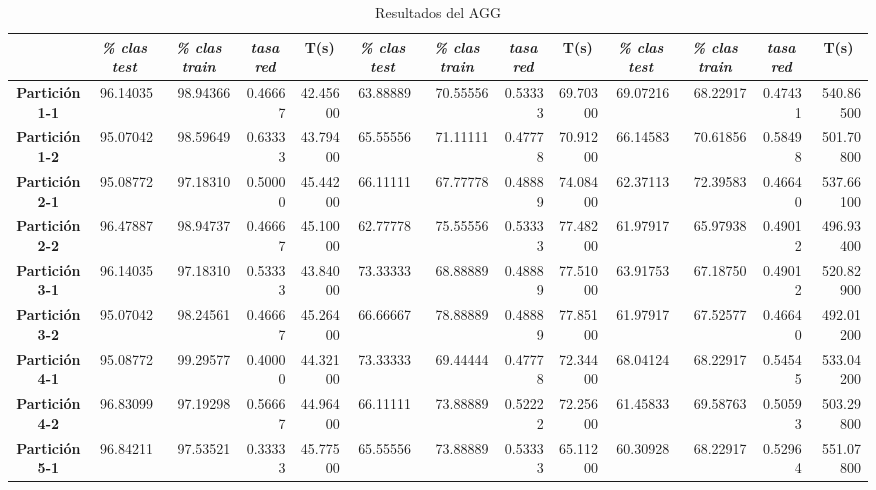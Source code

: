 \documentclass[a4paper,11pt]{article}
\begin{document}
 
 \begin{table}[H]	
  \caption{Resultados del AGG}
  \begin{adjustbox}{width=1.1\textwidth}
  \begin{tabular}{|c|r|r|r|r|r|r|r|r|r|r|r|r|}
  \hline
  \multicolumn{1}{|l|}{} & \multicolumn{1}{c|}{\textbf{\textit{\% clas test}}} & \multicolumn{1}{c|}{\textbf{\textit{\% clas train}}} & \multicolumn{1}{c|}{\textbf{\textit{tasa red}}} & \multicolumn{1}{c|}{\textbf{T(s)}} & \multicolumn{1}{c|}{\textbf{\textit{\% clas test}}} & \multicolumn{1}{c|}{\textbf{\textit{\% clas train}}} & \multicolumn{1}{c|}{\textbf{\textit{tasa red}}} & \multicolumn{1}{c|}{\textbf{T(s)}} & \multicolumn{1}{c|}{\textbf{\textit{\% clas test}}} & \multicolumn{1}{c|}{\textbf{\textit{\% clas train}}} & \multicolumn{1}{c|}{\textbf{\textit{tasa red}}} & \multicolumn{1}{c|}{\textbf{T(s)}} \\ \hline
  \textbf{Partición 1-1} & 96.14035 & 98.94366 & 0.46667 & 42.45600 & 63.88889 & 70.55556 & 0.53333 & 69.70300 & 69.07216 & 68.22917 & 0.47431 & 540.86500 \\ \hline
  \textbf{Partición 1-2} & 95.07042 & 98.59649 & 0.63333 & 43.79400 & 65.55556 & 71.11111 & 0.47778 & 70.91200 & 66.14583 & 70.61856 & 0.58498 & 501.70800 \\ \hline
  \textbf{Partición 2-1} & 95.08772 & 97.18310 & 0.50000 & 45.44200 & 66.11111 & 67.77778 & 0.48889 & 74.08400 & 62.37113 & 72.39583 & 0.46640 & 537.66100 \\ \hline
  \textbf{Partición 2-2} & 96.47887 & 98.94737 & 0.46667 & 45.10000 & 62.77778 & 75.55556 & 0.53333 & 77.48200 & 61.97917 & 65.97938 & 0.49012 & 496.93400 \\ \hline
  \textbf{Partición 3-1} & 96.14035 & 97.18310 & 0.53333 & 43.84000 & 73.33333 & 68.88889 & 0.48889 & 77.51000 & 63.91753 & 67.18750 & 0.49012 & 520.82900 \\ \hline
  \textbf{Partición 3-2} & 95.07042 & 98.24561 & 0.46667 & 45.26400 & 66.66667 & 78.88889 & 0.48889 & 77.85100 & 61.97917 & 67.52577 & 0.46640 & 492.01200 \\ \hline
  \textbf{Partición 4-1} & 95.08772 & 99.29577 & 0.40000 & 44.32100 & 73.33333 & 69.44444 & 0.47778 & 72.34400 & 68.04124 & 68.22917 & 0.54545 & 533.04200 \\ \hline
  \textbf{Partición 4-2} & 96.83099 & 97.19298 & 0.56667 & 44.96400 & 66.11111 & 73.88889 & 0.52222 & 72.25600 & 61.45833 & 69.58763 & 0.50593 & 503.29800 \\ \hline
  \textbf{Partición 5-1} & 96.84211 & 97.53521 & 0.33333 & 45.77500 & 65.55556 & 73.88889 & 0.53333 & 65.11200 & 60.30928 & 68.22917 & 0.52964 & 551.07800 \\ \hline

\end{tabular}
\end{adjustbox}
\end{table}
\end{document}
